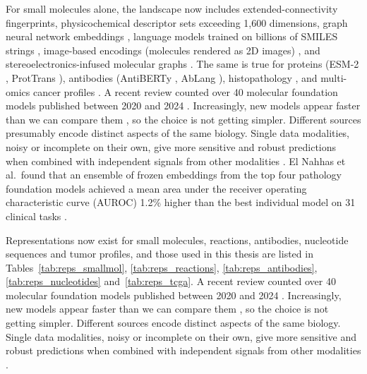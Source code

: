 For small molecules alone, the landscape now includes extended-connectivity fingerprints, physicochemical descriptor sets exceeding 1,600 dimensions, graph neural network embeddings \citep{Yang2019, Fang2022}, language models trained on billions of SMILES strings \citep{ross2022}, image-based encodings (molecules rendered as 2D images) \citep{Zeng2022}, and stereoelectronics-infused molecular graphs \citep{Boiko2025}. The same is true for proteins (ESM-2 \citep{Lin2023}, ProtTrans \citep{Elnaggar2022}), antibodies (AntiBERTy \citep{Ruffolo2021}, AbLang \citep{Olsen2022}), histopathology \citep{ElNahhas2025}, and multi-omics cancer profiles \citep{Steyaert2023}. A recent review counted over 40 molecular foundation models published between 2020 and 2024 \citep{Song2026}. Increasingly, new models appear faster than we can compare them \citep{Bommasani2021}, so the choice is not getting simpler. Different sources presumably encode distinct aspects of the same biology. Single data modalities, noisy or incomplete on their own, give more sensitive and robust predictions when combined with independent signals from other modalities \citep{Steyaert2023}. El Nahhas et al.\ found that an ensemble of frozen embeddings from the top four pathology foundation models achieved a mean area under the receiver operating characteristic curve (AUROC) 1.2\% higher than the best individual model on 31 clinical tasks \citep{ElNahhas2025}.

Representations now exist for small molecules, reactions, antibodies, nucleotide sequences and tumor profiles, and those used in this thesis are listed in Tables~\ref{tab:reps_smallmol}, \ref{tab:reps_reactions}, \ref{tab:reps_antibodies}, \ref{tab:reps_nucleotides} and~\ref{tab:reps_tcga}. A recent review counted over 40 molecular foundation models published between 2020 and 2024 \citep{Song2026}. Increasingly, new models appear faster than we can compare them \citep{Bommasani2021}, so the choice is not getting simpler. Different sources encode distinct aspects of the same biology. Single data modalities, noisy or incomplete on their own, give more sensitive and robust predictions when combined with independent signals from other modalities \citep{Steyaert2023}.

